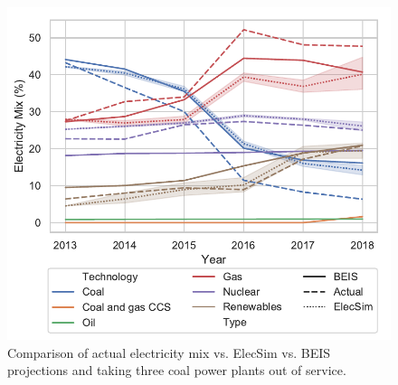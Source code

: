 %






\begin{figure}
	\centering
	\includegraphics[width=\columnwidth]{Chapter4/figures/e-Energy-2020/results/throughout_years_beis_elecsim_comparison_coal_dropout_leg_below.pdf}
	\caption{Comparison of actual electricity mix vs. ElecSim vs. BEIS projections and taking three coal power plants out of service.}
	\label{fig:beis_elecsim_historic_comparison}
\end{figure}



